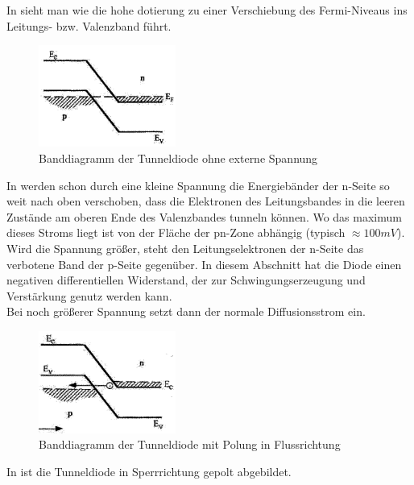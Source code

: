 In  sieht man wie die hohe dotierung zu einer Verschiebung des Fermi-Niveaus ins Leitungs- bzw. Valenzband f\"uhrt.
    \begin{figure}[H]
        \centering
        \includegraphics[width=0.4\textwidth]{fig/tunneldiode0V}
        \caption{Banddiagramm der Tunneldiode ohne externe Spannung}
        \label{fig:tunneldiode0V}
    \end{figure}
In  werden schon durch eine kleine Spannung die Energieb\"ander der n-Seite
so weit nach oben verschoben, dass die Elektronen des Leitungsbandes in die leeren Zust\"ande am oberen Ende des Valenzbandes tunneln k\"onnen. Wo das maximum dieses Stroms liegt ist von der Fl\"ache der pn-Zone abh\"angig (typisch $\approx 100mV$).\\
Wird die Spannung gr\"oßer, steht den Leitungselektronen der n-Seite das verbotene Band der p-Seite gegen\"uber.
In diesem Abschnitt hat die Diode einen negativen differentiellen Widerstand, der zur Schwingungserzeugung
und Verst\"arkung genutz werden kann.\\
Bei noch gr\"oßerer Spannung setzt dann der normale Diffusionsstrom ein.
    \begin{figure}[H]
        \centering
        \includegraphics[width=0.4\textwidth]{fig/tunneldiodeFlusspolung}
        \caption{Banddiagramm der Tunneldiode mit Polung in Flussrichtung}
        \label{fig:tunneldiodeFlusspolung}
    \end{figure}
In  ist die Tunneldiode in Sperrrichtung gepolt abgebildet.
